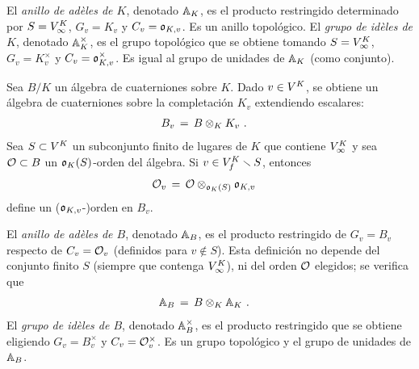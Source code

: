 \begin{defAdelesIdelesNumeros}\label{def:adelesidelesnumeros}
	El \emph{anillo de ad\`{e}les de $K$}, denotado $\adeles{K}$, es el
	producto restringido determinado por $S=\lugares[\infty]{K}$,
	$G_{v}=K_{v}$ y $C_{v}=\oka{K,v}$. Es un anillo topol\'{o}gico.
	El \emph{grupo de id\`{e}les de $K$}, denotado $\ideles{K}$, es el
	grupo topol\'{o}gico que se obtiene tomando $S=\lugares[\infty]{K}$,
	$G_{v}=K_{v}^{\times}$ y $C_{v}=\oka{K,v}^{\times}$. Es igual al grupo
	de unidades de $\adeles{K}$ (como conjunto).
\end{defAdelesIdelesNumeros}

Sea $B/K$ un \'{a}lgebra de cuaterniones sobre $K$. Dado $v\in\lugares{K}$, se
obtiene un \'{a}lgebra de cuaterniones sobre la completaci\'{o}n $K_{v}$
extendiendo escalares:
\begin{align*}
	B_{v} & \,=\,B\tensor[K]K_{v}
	\text{ .}
\end{align*}
%
Sea $S\subset\lugares{K}$ un subconjunto finito de lugares de $K$ que contiene
$\lugares[\infty]{K}$ y sea $\cal{O}\subset B$ un $\oka{K}(S)$-orden del
\'{a}lgebra. Si $v\in\lugares[f]{K}\setmin S$, entonces
\begin{align*}
	\cal{O}_{v} & \,=\,\cal{O}\tensor[\oka{K}(S)]\oka{K,v}
\end{align*}
%
define un ($\oka{K,v}$-)orden en $B_{v}$.

\begin{defAdelesIdelesCuaterniones}\label{def:adelesidelescuaterniones}
	El \emph{anillo de ad\`{e}les de $B$}, denotado $\adeles{B}$, es el
	producto restringido de $G_{v}=B_{v}$ respecto de $C_{v}=\cal{O}_{v}$
	(definidos para $v\not\in S$). Esta definici\'{o}n no depende del
	conjunto finito $S$ (siempre que contenga $\lugares[\infty]{K}$), ni
	del orden $\cal{O}$ elegidos; se verifica que
	\begin{align*}
		\adeles{B} & \,=\, B\tensor[K]\adeles{K}
		\text{ .}
	\end{align*}
	El \emph{grupo de id\`{e}les de $B$}, denotado $\ideles{B}$, es el
	producto restringido que se obtiene eligiendo $G_{v}=B_{v}^{\times}$ y
	$C_{v}=\cal{O}_{v}^{\times}$. Es un grupo topol\'{o}gico y el grupo de
	unidades de $\adeles{B}$.
\end{defAdelesIdelesCuaterniones}

